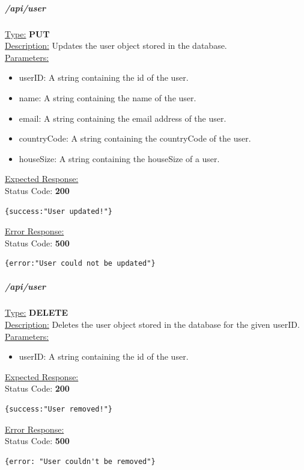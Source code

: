 \documentclass[preprint,12pt,3p]{elsarticle}
\newcommand{\forceindent}{\leavevmode{\parindent=1em\indent}}
\begin{document}
\subparagraph*{/api/user}
\underline{Type:} \textbf{PUT}\\

\underline{Description:} Updates the user object stored in the database.\\

\underline{Parameters:}
\begin{itemize}
\item userID: A string containing the id of the user.

\item name: A string containing the name of the user.

\item email: A string containing the email address of the user.

\item countryCode: A string containing the countryCode of the user.

\item houseSize: A string containing the houseSize of a user.
\end{itemize}
\underline{Expected Response:}\\[5pt]
\forceindent Status Code: \textbf{200} \\
\begin{verbatim}
{success:"User updated!"}
\end{verbatim}
\underline{Error Response:}\\[5pt]
\forceindent Status Code: \textbf{500} \\
\begin{verbatim}
{error:"User could not be updated"}
\end{verbatim}

\subparagraph*{/api/user}
\underline{Type:} \textbf{DELETE}\\

\underline{Description:} Deletes the user object stored in the database for the given userID.\\

\underline{Parameters:}
\begin{itemize}
\item userID: A string containing the id of the user.
\end{itemize}

\underline{Expected Response:}\\[5pt]
\forceindent Status Code: \textbf{200} \\
\begin{verbatim}
{success:"User removed!"}
\end{verbatim}
\underline{Error Response:}\\[5pt]
\forceindent Status Code: \textbf{500} \\
\begin{verbatim}
{error: "User couldn't be removed"}
\end{verbatim}
\end{document}
